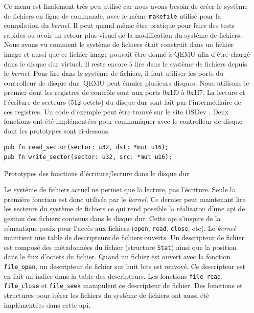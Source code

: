 Ce menu est finalement très peu utilisé car nous avons besoin de créer le système
de fichiers en ligne de commande, avec le même \texttt{makefile} utilisé
pour la compilation du \textit{kernel}. Il peut quand même être pratique pour faire
des tests rapides ou avoir un retour plus visuel de la modification
du système de fichiers. Nous avons vu comment le système de fichiers était construit
dans un fichier image et aussi que ce fichier image pouvait être donné à QEMU afin
d'être chargé dans le disque dur virtuel. Il reste encore à lire dans le système
de fichiers depuis le \textit{kernel}. Pour lire dans le système de fichiers, il
faut utiliser les ports du controlleur de disque dur. QEMU peut émuler plusieurs
disques. Nous utilisons le premier dont les registres de contrôle sont aux ports
0x1f0 à 0x1f7. La lecture et l'écriture de secteurs (512 octets) du disque dur
sont fait par l'intermédiaire de ces registres. Un code d'exemple peut être trouvé
sur le site OSDev \cite{ref24}. Deux fonctions ont été implémentées pour communiquer
avec le controlleur de disque dont les prototypes sont ci-dessous.

\begin{code}
\begin{verbatim}
pub fn read_sector(sector: u32, dst: *mut u16);
pub fn write_sector(sector: u32, src: *mut u16);
\end{verbatim}
\caption{Prototypes des fonctions d'écriture/lecture dans le disque dur}
\label{lst:fs:impl:rw}
\end{code} \bigbreak

Le système de fichiers actuel ne permet que la lecture, pas l'écriture.
Seule la première fonction est donc utilisée par le \textit{kernel}. Ce dernier
peut maintenant lire les secteurs du système de fichiers ce qui rend possible
la réalisaton d'une \acrshort{api} de gestion des fichiers contenus dans le disque dur.
Cette \acrshort{api} s'inspire de la sémantique \acrshort{posix} pour l'accès aux
fichiers (\texttt{open}, \texttt{read}, \texttt{close},
etc). Le \textit{kernel} maintient une table de descripteurs de fichiers ouverts.
Un descripteur de fichier est composé des métadonnées du fichier (structure
\texttt{Stat}) ainsi que la position dans le flux d'octets du fichier.
Quand un fichier est ouvert avec la fonction \texttt{file_open}, un descripteur
de fichier sur huit bits est renvoyé. Ce descripteur est en fait un indice dans
la table des descripteurs. Les fonctions \texttt{file_read},
\texttt{file_close} et \texttt{file_seek} manipulent
ce descripteur de fichier. Des fonctions et structures pour itérer les fichiers
du système de fichiers ont aussi été implémentées dans cette \acrshort{api}.